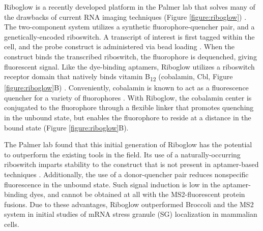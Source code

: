 Riboglow is a recently developed platform in the Palmer lab that solves many of the drawbacks of current RNA imaging techniques (Figure \ref{figure:riboglow}) \cite{BraselmannDevelopmentriboswitchbasedplatform2017}. The two-component system utilizes a synthetic fluorophore-quencher pair, and a genetically-encoded riboswitch. A transcript of interest is first tagged within the cell, and the probe construct is administered via bead loading \cite{McNeilGlassbeadsload1987,Hayashi-TakanakaTrackingepigenetichistone2011,MorisakiRealtimequantificationsingle2016}.
When the construct binds the transcribed riboswitch, the fluorophore is dequenched, giving fluorescent signal. Like the dye-binding aptamers, Riboglow utilizes a riboswitch receptor domain that natively binds vitamin B\textsubscript{12} (cobalamin, Cbl, Figure \ref{figure:riboglow}B) \cite{JohnsonJrB12cofactorsdirectly2012}.
Conveniently, cobalamin is known to act as a fluorescence quencher for a variety of fluorophores \cite{RosendahlSynthesisbiologicalactivity1982,LeeDesignSynthesisCharacterization2009,SmeltzerSynthesisCharacterizationFluorescent2001}.
With Riboglow, the cobalamin center is conjugated to the fluorophore through a flexible linker that promotes quenching in the unbound state, but enables the fluorophore to reside at a distance in the bound state (Figure \ref{figure:riboglow}B).

The Palmer lab found that this initial generation of Riboglow has the potential to outperform the existing tools in the field.
Its use of a naturally-occurring riboswitch imparts stability to the construct that is not present in aptamer-based techniques \cite{PorterRecurrentRNAmotifs2017}.
Additionally, the use of a donor-quencher pair reduces nonspecific fluorescence in the unbound state. Such signal induction is low in the aptamer-binding dyes, and cannot be obtained at all with the MS2-fluorescent protein fusions. Due to these advantages, Riboglow outperformed Broccoli and the MS2 system in initial studies of mRNA stress granule (SG) localization in mammalian cells.

